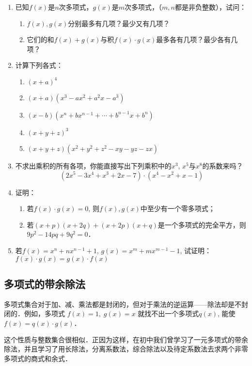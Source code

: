 \begin{ex}
\begin{enumerate}
    \item 已知$f(x)$是$n$次多项式，$g(x)$是$m$次多项式，（$m,n$都是非负整数），试问：
    \begin{enumerate}
        \item $f(x),g(x)$分别最多有几项？最少又有几项？
        \item 它们的和$f(x)+g(x)$与积$f(x)\cdot g(x)$最多各有几项？最少各有几项？
    \end{enumerate}
   \item 计算下列各式：
\begin{enumerate}
    \item $(x+a)^4$
    \item $(x+a)(x^3-ax^2+a^2x-a^3)$
    \item $(x-b)(x^n+bx^{n-1}+\cdots+b^{n-1}x+b^n)$
    \item $(x+y+z)^3$
    \item $(x+y+z)(x^2+y^2+z^2-xy-yz-zx)$
\end{enumerate}
   
\item 不求出乘积的所有各项，你能直接写出下列乘积中的$x^3$, $x^5$与$x^8$的系数来吗？
\[(2x^5-3x^4+x^3+2x-7) \cdot (x^4-x^2+x-1)\]
\item 证明：
\begin{enumerate}
\item 若$f(x)\cdot  g(x)=0$, 则$f(x),g(x)$中至少有一个零多项式；
\item 若$(x+p)(x+2q)+(x+2p)(x+q)$是一个多项式的完全平方，则$9p^2-14pq+9q^2=0$．  
\end{enumerate}

\item 若$f(x)=x^n+nx^{n-1}+1$, $g(x)=x^m+mx^{m-1}-1$, 试证明：$f (x) \cdot g (x) =g (x) \cdot f (x)$
\end{enumerate}
\end{ex}

\subsection{多项式的带余除法}

多项式集合对于加、减、乘法都是封闭的，但对于乘法的逆运算——除法却是不封闭的．例如，多项式
$f (x) =1,\; g (x) =x$
就找不出一个多项式$q(x)$, 能使
$f(x) =q(x)\cdot g(x)$．

这个性质与整数集合很相似．正因为这样，在初中我们曾学习了一元多项式的带余除法，并且学习了用长除法，分离系数法，综合除法以及待定系数法去求两个非零多项式的商式和余式．

